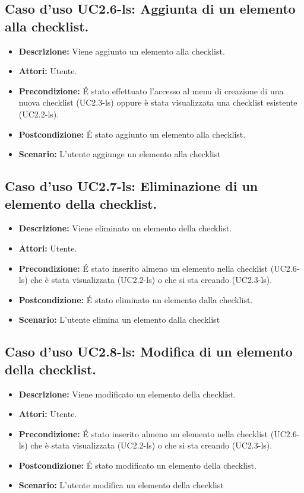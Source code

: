 \subsection{Caso d'uso UC2.6-ls: Aggiunta di un elemento alla checklist.}
\begin{itemize}
\item[]\textbf{Descrizione:} Viene aggiunto un elemento alla checklist.
\item[]\textbf{Attori:} Utente. 
\item[]\textbf{Precondizione:} \'E stato effettuato l'accesso al menu di creazione di una nuova checklist (UC2.3-ls) oppure è stata visualizzata una checklist esistente (UC2.2-ls). 
\item[]\textbf{Postcondizione:} \'E stato aggiunto un elemento alla checklist. 
\item[]\textbf{Scenario:}
L'utente aggiunge un elemento alla checklist 
\end{itemize}

\subsection{Caso d'uso UC2.7-ls: Eliminazione di un elemento della checklist.}
\begin{itemize}
\item[]\textbf{Descrizione:} Viene eliminato un elemento della checklist.
\item[]\textbf{Attori:} Utente. 
\item[]\textbf{Precondizione:} \'E stato inserito almeno un elemento nella checklist (UC2.6-ls) che è stata visualizzata (UC2.2-ls) o che si sta creando (UC2.3-ls). 
\item[]\textbf{Postcondizione:} \'E stato eliminato un elemento dalla checklist. 
\item[]\textbf{Scenario:}
L'utente elimina un elemento dalla checklist 
\end{itemize}

\subsection{Caso d'uso UC2.8-ls: Modifica di un elemento della checklist.}
\begin{itemize}
\item[]\textbf{Descrizione:} Viene modificato un elemento della checklist.
\item[]\textbf{Attori:} Utente. 
\item[]\textbf{Precondizione:} \'E stato inserito almeno un elemento nella checklist (UC2.6-ls) che è stata visualizzata (UC2.2-ls) o che si sta creando (UC2.3-ls). 
\item[]\textbf{Postcondizione:} \'E stato modificato un elemento della checklist. 
\item[]\textbf{Scenario:}
L'utente modifica un elemento della checklist 
\end{itemize}

